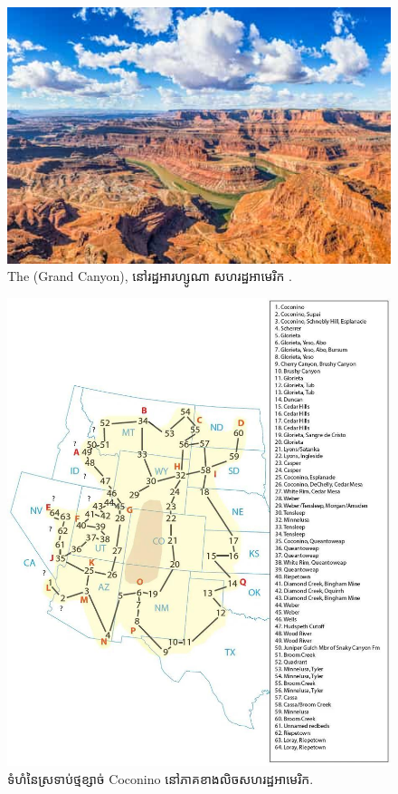 \documentclass[10pt,twocolumn,letterpaper]{article}
\begin{document}
\begin{figure}[t]
\begin{center}
   \includegraphics[width=1\linewidth]{grand-canyon.jpg}

\end{center}
   \caption{The (Grand Canyon), នៅរដ្ឋអារហ្សូណា សហរដ្ឋអាមេរិក \cite{49}.}
\label{fig:2}
\label{fig:onecol}
\end{figure}

\begin{figure}[t]
\begin{center}
   \includegraphics[width=1\linewidth]{coconino.jpg}
\end{center}
   \caption{ទំហំនៃស្រទាប់ថ្មខ្សាច់ Coconino នៅភាគខាងលិចសហរដ្ឋអាមេរិក\cite{21}.}
\label{fig:3}
\label{fig:onecol}
\end{figure}
\end{document}
